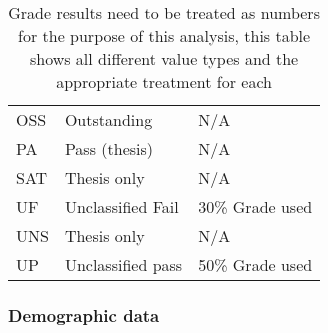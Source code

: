 \begin{table}[H]
\begin{tabular}{|l|l|l|}
    OSS                                   & Outstanding                           & N/A                                          \\
    PA                                    & Pass (thesis)                         & N/A                                          \\
    SAT                                   & Thesis only                           & N/A                                          \\
    UF                                    & Unclassified Fail                     & 30\% Grade used                              \\
    UNS                                   & Thesis only                           & N/A                                          \\
    UP                                    & Unclassified pass                     & 50\% Grade used                              \\
    \hline
  \end{tabular}
  \caption{Grade results need to be treated as numbers for the purpose of this analysis, this table shows all different value types and the appropriate treatment for each}
\end{table}

\subsubsection{Demographic data}
\label{appendix:demographic-data}


